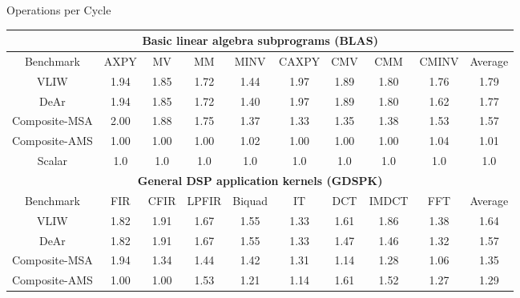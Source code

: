 \documentclass{beamer}
\begin{document}
\begin{CJK}{UTF8}{bkai}
            \begin{frame}{Operations per Cycle}
                \vspace{-2em}
                \begin{table}[!ht]
                    \centering
                    \resizebox{\columnwidth}{!}
                    {
                        \begin{tabular}{|c|c|c|c|c|c|c|c|c|c|}
                            \hline
                            \multicolumn{10}{|c|}{\textbf{Basic linear algebra subprograms (BLAS)}} \\ \hline
                            Benchmark  &  AXPY  &  MV  &  MM  &  MINV  &  CAXPY  &  CMV  &  CMM  &  CMINV  &  Average \\ \hline 
                            VLIW  &   1.94  &   1.85  &   1.72  &   1.44  &   1.97  &   1.89  &   1.80  &   1.76  &   1.79     \\ \hline 
                            DeAr  &   1.94  &   1.85  &   1.72  &   1.40  &   1.97  &   1.89  &   1.80  &   1.62  &   1.77     \\ \hline
                            Composite-MSA  &   2.00  &   1.88  &   1.75  &   1.37  &   1.33  &   1.35  &   1.38  &   1.53  &   1.57     \\ \hline 
                            Composite-AMS  &   1.00  &   1.00  &   1.00  &   1.02  &   1.00  &   1.00  &   1.00  &   1.04  &   1.01     \\ \hline 
                            Scalar  & 1.0  & 1.0  & 1.0  & 1.0  & 1.0  & 1.0  & 1.0  & 1.0  & 1.0 \\ \hline 
                            \multicolumn{10}{|c|}{\textbf{General DSP application kernels (GDSPK)}}                     \\ \hline
                            Benchmark  &  FIR  &  CFIR  &  LPFIR  &  Biquad  &  IT  &  DCT  &  IMDCT  &  FFT  &  Average \\ \hline 
                            VLIW  &   1.82  &   1.91  &   1.67  &   1.55  &   1.33  &   1.61  &   1.86  &   1.38  &   1.64     \\ \hline 
                            DeAr  &   1.82  &   1.91  &   1.67  &   1.55  &   1.33  &   1.47  &   1.46  &   1.32  &   1.57     \\ \hline 
                            Composite-MSA  &   1.94  &   1.34  &   1.44  &   1.42  &   1.31  &   1.14  &   1.28  &   1.06  &   1.35     \\ \hline 
                            Composite-AMS  &   1.00  &   1.00  &   1.53  &   1.21  &   1.14  &   1.61  &   1.52  &   1.27  &   1.29     \\ \hline 

\end{tabular}}
\end{table}
\end{frame}
\end{CJK}
\end{document}
